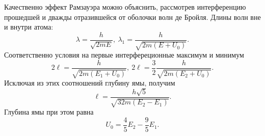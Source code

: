 \documentclass[a4paper,12pt]{article} %
\begin{document}
    Качественно эффект Рамзауэра можно объяснить, рассмотрев интерференцию прошедшей и дважды отразившейся от оболочки волн де Бройля. 
    Длины волн вне и внутри атома:
    \[\lambda = \dfrac{h}{\sqrt{2mE}},~\lambda_1 = \dfrac{h}{\sqrt{2m(E+U_0)}}.\]
    Соответственно условия на первые интерфереционные максимум и минимум 
    \begin{equation}\label{1}
    2\ell = \dfrac{h}{\sqrt{2m(E_1 + U_0)}},~2\ell = \dfrac{3}{2}\dfrac{h}{\sqrt{2m(E_2 + U_0)}}.
    \end{equation}
    Исключая из этих соотношений глубину ямы, получим
    \begin{equation}\label{2}
    \ell = \dfrac{h\sqrt{5}}{\sqrt{32m(E_2 - E_1)}}.
    \end{equation}
    Глубина ямы при этом равна
    \begin{equation}\label{4}
    U_0 = \dfrac{4}{5}E_2 - \dfrac{9}{5}E_1.
    \end{equation}
  
\end{document}
